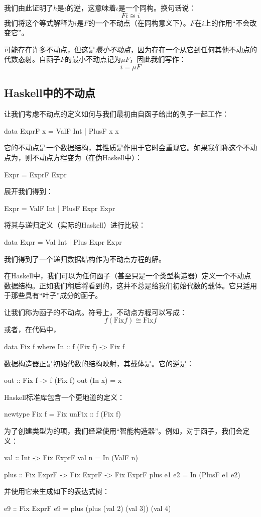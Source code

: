 \documentclass[DaoFP]{subfiles}
\begin{document}
我们由此证明了$h$是$\iota$的逆，这意味着$\iota$是一个同构。换句话说：
\[ F i \cong i \]
我们将这个等式解释为$i$是$F$的一个不动点（在同构意义下）。$F$在$i$上的作用“不会改变它”。

可能存在许多不动点，但这是\emph{最小不动点}，因为存在一个从它到任何其他不动点的代数态射。自函子$F$的最小不动点记为$\mu F$，因此我们写作：
\[ i = \mu F \]
\subsection{Haskell中的不动点}
让我们考虑不动点的定义如何与我们最初由自函子给出的例子一起工作：
\begin{haskell}
data ExprF x = ValF Int | PlusF x x
\end{haskell}
它的不动点是一个数据结构，其性质是作用于它时会重现它。如果我们称这个不动点为，则不动点方程变为（在伪Haskell中）：
\begin{haskell}
Expr = ExprF Expr
\end{haskell}
展开我们得到：
\begin{haskell}
Expr = ValF Int | PlusF Expr Expr
\end{haskell}
将其与递归定义（实际的Haskell）进行比较：
\begin{haskell}
data Expr = Val Int | Plus Expr Expr
\end{haskell}
我们得到了一个递归数据结构作为不动点方程的解。

在Haskell中，我们可以为任何函子（甚至只是一个类型构造器）定义一个不动点数据结构。正如我们稍后将看到的，这并不总是给我们初始代数的载体。它只适用于那些具有“叶子”成分的函子。

让我们称为函子的不动点。符号上，不动点方程可以写成：
\[f ( \text{Fix} f) \cong  \text{Fix} f \]
或者，在代码中，
\begin{haskell}
data Fix f where
  In :: f (Fix f) -> Fix f
\end{haskell}
数据构造器正是初始代数的结构映射，其载体是。它的逆是：
\begin{haskell}
out :: Fix f -> f (Fix f)
out (In x) = x
\end{haskell}
Haskell标准库包含一个更地道的定义：
\begin{haskell}
newtype Fix f = Fix { unFix :: f (Fix f) }
\end{haskell}

为了创建类型为的项，我们经常使用“智能构造器”。例如，对于函子，我们会定义：
\begin{haskell}
val :: Int -> Fix ExprF
val n = In (ValF n)

plus :: Fix ExprF -> Fix ExprF -> Fix ExprF
plus e1 e2 = In (PlusF e1 e2)
\end{haskell}
并使用它来生成如下的表达式树：
\begin{haskell}
e9 :: Fix ExprF
e9 = plus (plus (val 2) (val 3)) (val 4)
\end{haskell}
\end{document}
